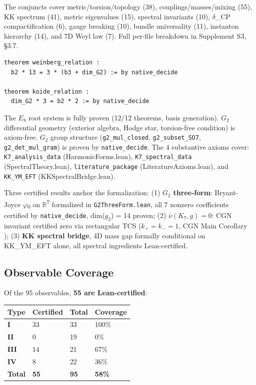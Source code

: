 \documentclass[11pt,a4paper]{article}
\begin{document}
The conjuncts cover metric/torsion/topology (38),
couplings/masses/mixing (55), KK spectrum (41), metric eigenvalues (15),
spectral invariants (10), \(\delta\)\_CP compactification (6), gauge
breaking (10), bundle universality (11), instanton hierarchy (14), and
7D Weyl law (7). Full per-file breakdown in Supplement S3, §3.7.

\begin{verbatim}
theorem weinberg_relation :
  b2 * 13 = 3 * (b3 + dim_G2) := by native_decide

theorem koide_relation :
  dim_G2 * 3 = b2 * 2 := by native_decide
\end{verbatim}

The \(E_{8}\) root system is fully proven (12/12 theorems, basis
generation). \(G_{2}\) differential geometry (exterior algebra, Hodge
star, torsion-free condition) is axiom-free. \(G_{2}\) group structure
(\texttt{g2\_mul\_closed}, \texttt{g2\_subset\_SO7},
\texttt{g2\_det\_mul\_gram}) is proven by \texttt{native\_decide}. The 4 substantive axioms cover: \texttt{K7\_analysis\_data}
(HarmonicForms.lean), \texttt{K7\_spectral\_data} (SpectralTheory.lean),
\texttt{literature\_package} (LiteratureAxioms.lean), and
\texttt{KK\_YM\_EFT} (KKSpectralBridge.lean).

Three certified results anchor the formalization: (1) \textbf{\(G_{2}\)
three-form}: Bryant-Joyce \(\varphi\)\textsubscript{0} on
\(\mathbb{R}\)\textsuperscript{7} formalized in
\texttt{G2ThreeForm.lean}, all 7 nonzero coefficients certified by
\texttt{native\_decide}, dim(\(g_{2}\)) = 14 proven; (2)
\textbf{$\bar{\nu}(K_{7}, g) = 0$}: CGN invariant certified zero via
rectangular TCS ($k_+ = k_- = 1$, CGN Main Corollary \cite{16}); (3)
\textbf{KK spectral bridge}, 4D mass gap formally conditional on
KK\_YM\_EFT alone, all spectral ingredients Lean-certified.

\subsection{Observable Coverage}

Of the 95 observables, \textbf{55 are Lean-certified}:

\begin{longtable}[]{@{}llll@{}}
\toprule\noalign{}
Type & Certified & Total & Coverage \\
\midrule\noalign{}
\endhead
\bottomrule\noalign{}
\endlastfoot
\textbf{I} & 33 & 33 & 100\% \\
\textbf{II} & 0 & 19 & 0\% \\
\textbf{III} & 14 & 21 & 67\% \\
\textbf{IV} & 8 & 22 & 36\% \\
\textbf{Total} & \textbf{55} & \textbf{95} & \textbf{58\%} \\
\end{longtable}
\end{document}
